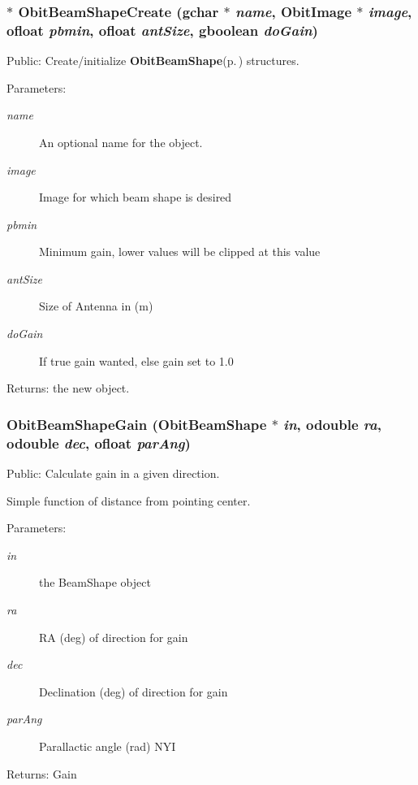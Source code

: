 \subsubsection{$\ast$ Obit\-Beam\-Shape\-Create (gchar $\ast$ {\em name}, {\bf Obit\-Image} $\ast$ {\em image}, {\bf ofloat} {\em pbmin}, {\bf ofloat} {\em ant\-Size}, gboolean {\em do\-Gain})}\label{ObitBeamShape_8h_a9}


Public: Create/initialize {\bf Obit\-Beam\-Shape}{\rm (p.\,\pageref{structObitBeamShape})} structures. 

\begin{Desc}
\item[Parameters:]
\begin{description}
\item[{\em name}]An optional name for the object. \item[{\em image}]Image for which beam shape is desired \item[{\em pbmin}]Minimum gain, lower values will be clipped at this value \item[{\em ant\-Size}]Size of Antenna in (m) \item[{\em do\-Gain}]If true gain wanted, else gain set to 1.0 \end{description}
\end{Desc}
\begin{Desc}
\item[Returns:]the new object. \end{Desc}
\subsubsection{ Obit\-Beam\-Shape\-Gain ({\bf Obit\-Beam\-Shape} $\ast$ {\em in}, {\bf odouble} {\em ra}, {\bf odouble} {\em dec}, {\bf ofloat} {\em par\-Ang})}\label{ObitBeamShape_8h_a13}


Public: Calculate gain in a given direction. 

Simple function of distance from pointing center. \begin{Desc}
\item[Parameters:]
\begin{description}
\item[{\em in}]the Beam\-Shape object \item[{\em ra}]RA (deg) of direction for gain \item[{\em dec}]Declination (deg) of direction for gain \item[{\em par\-Ang}]Parallactic angle (rad) NYI \end{description}
\end{Desc}
\begin{Desc}
\item[Returns:]Gain \end{Desc}
